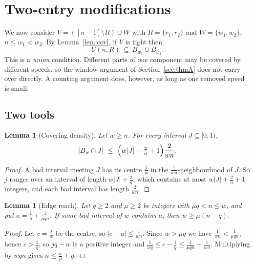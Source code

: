 \documentclass[11pt]{article}
\newtheorem{lemma}[theorem]{Lemma}
\theoremstyle{definition}
\begin{document}
\section{Two-entry modifications}\label{sec:twoswap}

We now consider $V=([n-1]\setminus R)\cup W$ with $R=\{r_1,r_2\}$ and
$W=\{w_1,w_2\}$, $n\le w_1<w_2$. By Lemma~\ref{lem:cov}, if $V$ is tight
then
\[
U(n,R)\ \subseteq\ B_{w_1}\cup B_{w_2}.
\]
This is a \emph{union} condition. Different parts of one component may
be covered by different speeds, so the window argument of
Section~\ref{sec:thmA} does not carry over directly. A counting
argument does, however, as long as one removed speed is small.

\subsection{Two tools}

\begin{lemma}[Covering density]\label{lem:density}
Let $w\ge n$. For every interval $J\subseteq[0,1)$,
\[
\lvert B_w\cap J\rvert\ \le\ \Bigl(w\lvert J\rvert+\tfrac2n+1\Bigr)\frac2{wn}.
\]
\end{lemma}

\begin{proof}
A bad interval meeting $J$ has its centre $\frac jw$ in the
$\frac1{wn}$-neighbourhood of $J$. So $j$ ranges over an interval of
length $w\lvert J\rvert+\frac2n$, which contains at most
$w\lvert J\rvert+\frac2n+1$ integers, and each bad interval has length
$\frac2{wn}$.
\end{proof}

\begin{lemma}[Edge reach]\label{lem:edge}
Let $q\ge2$ and $\mu\ge2$ be integers with $\mu q<n\le w$, and put
$a=\frac1q+\frac1{\mu qn}$. If some bad interval of $w$ contains $a$,
then $w\ge\mu(n-q)$.
\end{lemma}

\begin{proof}
Let $c=\frac jw$ be the centre, so $\lvert c-a\rvert\le\frac1{wn}$.
Since $w>\mu q$ we have $\frac1{wn}<\frac1{\mu qn}$, hence
$c>\frac1q$, so $jq-w$ is a positive integer and
$\frac1{wq}\le c-\frac1q\le\frac1{\mu qn}+\frac1{wn}$. Multiplying by
$wqn$ gives $n\le\frac w\mu+q$.
\end{proof}
\end{document}
